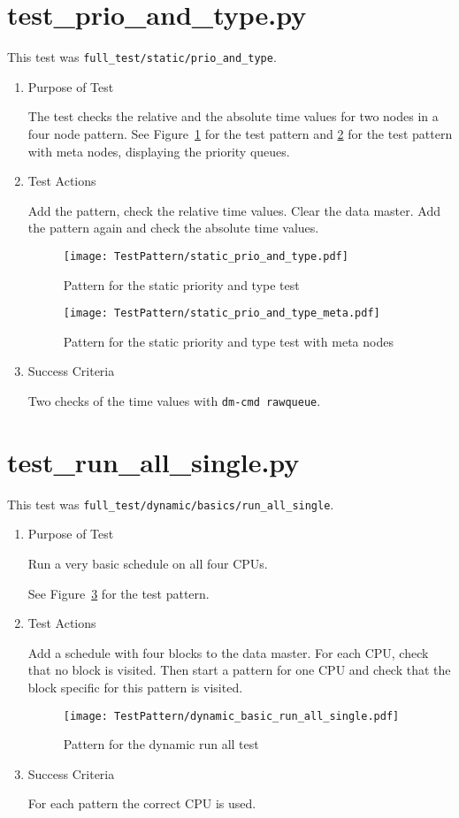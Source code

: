 \documentclass[12pt,a4paper]{report}
\begin{document}
\section{test\_prio\_and\_type.py}
This test was \texttt{full\_test/static/prio\_and\_type}.
\begin{enumerate}
	\item Purpose of Test

The test checks the relative and the absolute time values for two nodes in a four node pattern.
See Figure~\ref{fig:Pattern_for_the_static_priority_and_type_test} for the test pattern
and \ref{fig:Pattern_for_the_static_priority_and_type_test_with_meta_nodes} for the test pattern with meta nodes,
displaying the priority queues.
	\item Test Actions

	Add the pattern, check the relative time values. Clear the data master. Add the pattern again and check the absolute time values.
    \begin{figure}
        \centering
        \texttt{[image: TestPattern/static\_prio\_and\_type.pdf]}
        \caption{Pattern for the static priority and type test}
        \label{fig:Pattern_for_the_static_priority_and_type_test}
    \end{figure}
    \begin{figure}
        \centering
        \texttt{[image: TestPattern/static\_prio\_and\_type\_meta.pdf]}
        \caption{Pattern for the static priority and type test with meta nodes}
        \label{fig:Pattern_for_the_static_priority_and_type_test_with_meta_nodes}
    \end{figure}
	\item Success Criteria

	Two checks of the time values with \texttt{dm-cmd rawqueue}.
\end{enumerate}
\section{test\_run\_all\_single.py}
This test was \texttt{full\_test/dynamic/basics/run\_all\_single}.
\begin{enumerate}
	\item Purpose of Test

    Run a very basic schedule on all four CPUs.

	See Figure~\ref{fig:Pattern_for_the_dynamic_run_all_test} for the test pattern.
	\item Test Actions

	Add a schedule with four blocks to the data master. For each CPU, check that no block is visited. Then start
	a pattern for one CPU and check that the block specific for this pattern is visited.
    \begin{figure}
        \centering
        \texttt{[image: TestPattern/dynamic\_basic\_run\_all\_single.pdf]}
        \caption{Pattern for the dynamic run all test}
        \label{fig:Pattern_for_the_dynamic_run_all_test}
    \end{figure}
	\item Success Criteria

	For each pattern the correct CPU is used.
\end{enumerate}
\end{document}
